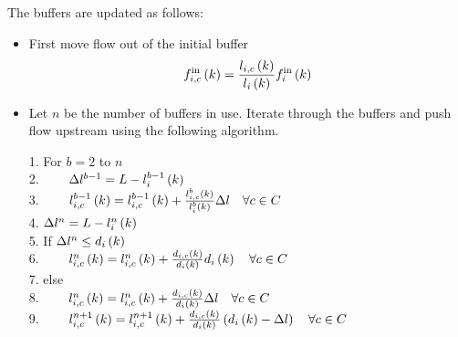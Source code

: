 \noindent The buffers are updated as follows:
\begin{itemize}
	\item First move flow out of the initial buffer\[
	\flowinmc{i}{k}{c} = \frac{\boundaryqueuemc{i}{k}{c}}{\boundaryqueue{i}{k}} \flowin{i}{k}
	\]
	\item Let $n$ be the number of buffers in use. Iterate through the buffers and push flow upstream using the following algorithm. \\
	\begin{algorithm}
	1. For $b=2$ to $n$\\
	2. \ \ \ \ $\Delta \boundaryqueuesymbol^{b-1} = L - \boundaryqueuemb{i}{k}{{b-1}}$\\
	3. \ \ \ \ $\boundaryqueuemcmb{i}{k}{c}{{b-1}} = \boundaryqueuemcmb{i}{k}{c}{{b-1}} + \frac{\boundaryqueuemcmb{i}{k}{c}{b}}{\boundaryqueuemb{i}{k}{b}} \Delta \boundaryqueuesymbol \ \ \ \forall{c \in{C}}$\\
	4. $\Delta \boundaryqueuesymbol^{n} = L - \boundaryqueuemb{i}{k}{{n}}$\\
	5. If $\Delta \boundaryqueuesymbol^{n} \leq{\boundarydemand{i}{k}}$\\
	6. \ \ \ \ $\boundaryqueuemcmb{i}{k}{c}{n} = \boundaryqueuemcmb{i}{k}{c}{n} + \frac{\boundarydemandmc{i}{k}{c}}{\boundarydemand{i}{k}} \boundarydemand{i}{k} \ \ \ \forall{c \in{C}}$\\
	7. else \\
	8. \ \ \ \ $\boundaryqueuemcmb{i}{k}{c}{n} = \boundaryqueuemcmb{i}{k}{c}{n} + \frac{\boundarydemandmc{i}{k}{c}}{\boundarydemand{i}{k}} \Delta \boundaryqueuesymbol \ \ \ \forall{c \in{C}}$\\
	9. \ \ \ \ $\boundaryqueuemcmb{i}{k}{c}{{n+1}} = \boundaryqueuemcmb{i}{k}{c}{{n+1}} + \frac{\boundarydemandmc{i}{k}{c}}{\boundarydemand{i}{k}} \left(\boundarydemand{i}{k} - \Delta \boundaryqueuesymbol\right)\ \ \ \forall{c \in{C}}$\\

	\end{algorithm}
\end{itemize}


